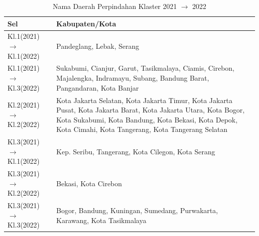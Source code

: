 \begin{table}[H]
\centering
\small
\caption{Nama Daerah Perpindahan Klaster 2021 \(\rightarrow\) 2022} \label{tab:transname2021x2022}
\begin{tabular}{|>{\raggedright\arraybackslash}m{}|>{\raggedright\arraybackslash}m{}|}
\hline
\textbf{Sel} & \textbf{Kabupaten/Kota} \\
\hline
Kl.1(2021) \(\rightarrow\) Kl.1(2022) & Pandeglang, Lebak, Serang \\
\hline
Kl.1(2021) \(\rightarrow\) Kl.3(2022) & Sukabumi, Cianjur, Garut, Tasikmalaya, Ciamis, Cirebon, Majalengka, Indramayu, Subang, Bandung Barat, Pangandaran, Kota Banjar \\
\hline
Kl.2(2021) \(\rightarrow\) Kl.2(2022) & Kota Jakarta Selatan, Kota Jakarta Timur, Kota Jakarta Pusat, Kota Jakarta Barat, Kota Jakarta Utara, Kota Bogor, Kota Sukabumi, Kota Bandung, Kota Bekasi, Kota Depok, Kota Cimahi, Kota Tangerang, Kota Tangerang Selatan \\
\hline
Kl.3(2021) \(\rightarrow\) Kl.1(2022) & Kep. Seribu, Tangerang, Kota Cilegon, Kota Serang \\
\hline
Kl.3(2021) \(\rightarrow\) Kl.2(2022) & Bekasi, Kota Cirebon \\
\hline
Kl.3(2021) \(\rightarrow\) Kl.3(2022) & Bogor, Bandung, Kuningan, Sumedang, Purwakarta, Karawang, Kota Tasikmalaya \\
\hline
\end{tabular}
\end{table}